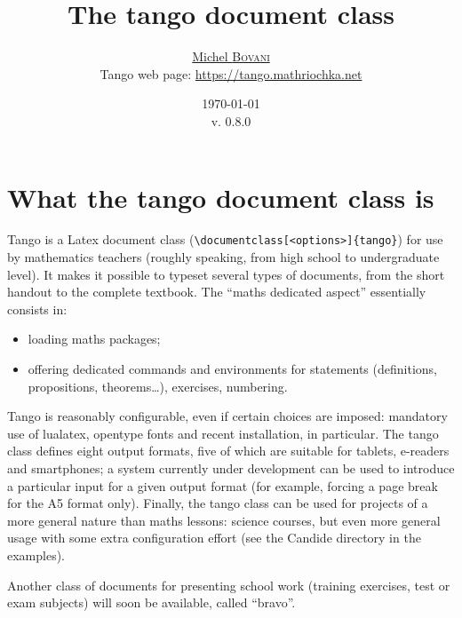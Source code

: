 \documentclass[english,ColorTheme=Red,FontSize=10pt]{tango}
\begin{document}
\renewcommand{\arraystretch}{1.1}
\title{\textcolor{ColorOne}{\floweroneleft}\,The tango document class\,\textcolor{ColorOne}{\floweroneright}}
\author{\href{mailto:michel.bovani@icloud.com}{Michel \textsc{Bovani}}\\
Tango web page: \href{https://tango.mathriochka.net}{https://tango.mathriochka.net}}
\date{\today\\v. 0.8.0}
{\sffamily
\maketitle

}
\thispagestyle{empty}

\tgoshorttoc
\section{What the tango document class is}


Tango is a Latex document class (\verb=\documentclass[<options>]{tango}=) for use by mathematics teachers (roughly speaking, from high school to undergraduate level). It makes it possible to typeset several types of documents, from the short handout to the complete textbook. The \enquote{maths dedicated aspect} essentially consists in:
\begin{itemize}
\item loading maths packages;
\item offering dedicated commands and environments for statements (definitions, propositions, theorems…), exercises, numbering.
\end{itemize}

Tango is reasonably configurable, even if certain choices are imposed: mandatory use of lualatex, opentype fonts and recent installation, in particular. The tango class defines eight output formats, five of which are suitable for tablets, e-readers and smartphones; a system currently under development can be used to introduce a particular input for a given output format (for example, forcing a page break for the A5 format only). Finally, the tango class can be used for projects of a more general nature than maths lessons: science courses, but even more general usage with some extra configuration effort (see the Candide directory in the examples). 

Another class of documents for presenting school work (training exercises, test or exam subjects) will soon be available, called \enquote{bravo}.
\end{document}
